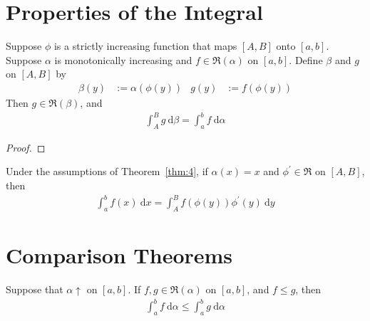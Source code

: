 \documentclass[thmcnt=section, 12pt]{elegantbook}
\begin{document}

\section{Properties of the Integral}


\begin{theorem} \label{thm:4}
    Suppose $\phi$ is a strictly increasing function that maps $[A, B]$ onto $[a, b]$. Suppose $\alpha$ is monotonically increasing and $f \in \mathfrak{R}(\alpha)$ on $[a, b]$. Define $\beta$ and $g$ on $[A, B]$ by
    \begin{align*}
        \beta(y) &:= \alpha(\phi(y)) & g(y) &:= f(\phi(y))
    \end{align*}
    Then $g \in \mathfrak{R}(\beta)$, and
    \begin{align*}
        \int_A^B g \ \mathrm{d} \beta = \int_a^b f \ \mathrm{d} \alpha
    \end{align*}
\end{theorem}

\begin{proof}
\end{proof}

\begin{corollary} \label{cor:1}
    Under the assumptions of Theorem~\ref{thm:4}, if $\alpha(x) = x$ and $\phi^\prime \in \mathfrak{R}$ on $[A, B]$, then
    \begin{align*}
        \int_a^b f(x) \ \mathrm{d} x = \int_A^B f(\phi(y)) \phi^\prime(y) \ \mathrm{d} y
    \end{align*}
\end{corollary}

\begin{example}
\end{example}


\section{Comparison Theorems}


\begin{theorem} \label{thm:26}
    Suppose that $\alpha \uparrow$ on $[a, b]$. If $f, g \in \mathfrak{R}(\alpha)$ on $[a, b]$, and $f \leq g$, then 
    \begin{align*}
        \int_a^b f \ \mathrm{d}\alpha
        \leq \int_a^b g \ \mathrm{d}\alpha
    \end{align*}
\end{theorem}
\end{document}
